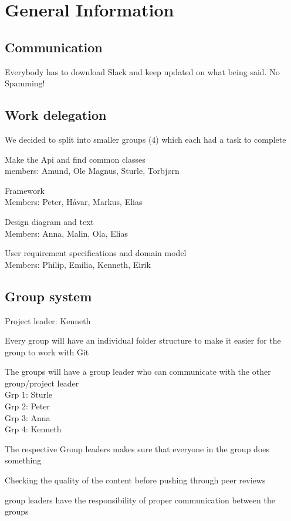 \documentclass[11pt]{meetingmins}
\begin{document}
\maketitle

\section{General Information}

\subsection{Communication}
\begin{items}
\item
Everybody has to download Slack and keep updated on what being said. No Spamming!
\end{items}

\subsection{Work delegation}
We decided to split into smaller groups (4) which each had a task to complete
\begin{items}
\item Make the Api and find common classes \\
members: Amund, Ole Magnus, Sturle, Torbj\o rn
\item Framework \\
Members: Peter, H\aa var, Markus, Elias
\item Design diagram and text \\
Members: Anna, Malin, Ola, Elias
\item User requirement specifications and domain model \\
Members: Philip, Emilia, Kenneth, Eirik
\end{items}

\subsection{Group system}
\begin{items}
\item Project leader: Kenneth
\item Every group will have an individual folder structure to make it easier for the group to work with Git
\item The groups will have a group leader who can communicate with the other group/project leader \\
Grp 1: Sturle \\
Grp 2: Peter \\
Grp 3: Anna \\
Grp 4: Kenneth
\item 
The respective Group leaders makes sure that everyone in the group does something
\item
Checking the quality of the content before pushing through peer reviews
\item group leaders have the responsibility of proper communication between the groups
\end{items}

\vspace{1em}
\end{document}
